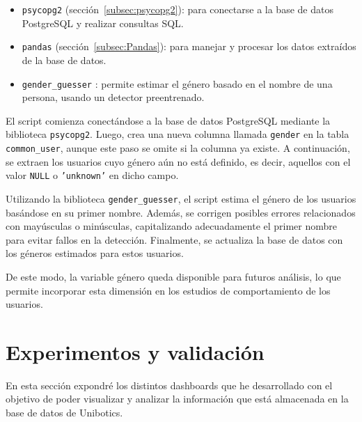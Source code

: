 \documentclass[a4paper, 12pt]{book}
\begin{document}
\begin{itemize}
    \item \texttt{psycopg2} (sección~\ref{subsec:psycopg2}): para conectarse a la base de datos PostgreSQL y realizar consultas SQL.
    \item \texttt{pandas} (sección~\ref{subsec:Pandas}): para manejar y procesar los datos extraídos de la base de datos.
    \item \texttt{gender\_guesser} \cite{genderGuesserDocumentation}: permite estimar el género basado en el nombre de una persona, usando un detector preentrenado.
\end{itemize}

El script comienza conectándose a la base de datos PostgreSQL mediante la biblioteca \texttt{psycopg2}. Luego, crea una nueva columna llamada \texttt{gender} en la tabla \texttt{common\_user}, aunque este paso se omite si la columna ya existe. A continuación, se extraen los usuarios cuyo género aún no está definido, es decir, aquellos con el valor \texttt{NULL} o \texttt{'unknown'} en dicho campo.

Utilizando la biblioteca \texttt{gender\_guesser}, el script estima el género de los usuarios basándose en su primer nombre. Además, se corrigen posibles errores relacionados con mayúsculas o minúsculas, capitalizando adecuadamente el primer nombre para evitar fallos en la detección. Finalmente, se actualiza la base de datos con los géneros estimados para estos usuarios.

De este modo, la variable género queda disponible para futuros análisis, lo que permite incorporar esta dimensión en los estudios de comportamiento de los usuarios.




\cleardoublepage



\chapter{Experimentos y validación}
\label{chap:experimentos}

En esta sección expondré los distintos dashboards que he desarrollado con el objetivo de poder visualizar y analizar la información que está almacenada en la base de datos de Unibotics.
\end{document}
